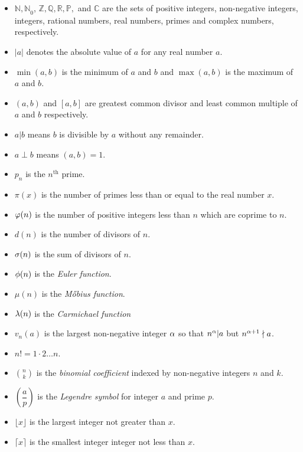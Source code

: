\documentclass{subfile}
\begin{document}
		\begin{itemize}
			\item $\mathbb{N,N}_0$, $\mathbb{Z, Q, R, P},$ and $\mathbb{C}$ are the sets of positive integers, non-negative integers, integers, rational numbers, real numbers, primes and complex numbers, respectively.
			\item $|a|$ denotes the absolute value of $a$ for any real number $a$.
			\item $\min(a,b)$ is the minimum of $a$ and $b$ and $\max(a,b)$ is the maximum of $a$ and $b$.
			\item $(a,b)$ and $[a,b]$ are greatest common divisor and least common multiple of $a$ and $b$ respectively.
			\item $a|b$ means $b$ is divisible by $a$ without any remainder.
			\item $a\perp b$ means $(a,b)=1$.
			\item $p_n$ is the $n^{\text{th}}$ prime.
			\item $\pi(x)$ is the number of primes less than or equal to the real number $x$.		
			\item $\varphi(n)$ is the number of positive integers less than $n$ which are coprime to $n$.
			\item $d(n)$ is the number of divisors of $n$.
			\item $\sigma(n)$ is the sum of divisors of $n$.
			\item $\phi(n)$ is the {\it Euler function}.
			\item $\mu(n)$ is the {\it M\H{o}bius function}.
			\item $\lambda(n)$ is the {\it Carmichael function}
			\item $v_n(a)$ is the largest non-negative integer $\alpha$ so that $n^\alpha|a$ but $n^{\alpha+1}\nmid a$.
			\item $n!=1\cdot2\dots n$.
			\item $\displaystyle \binom{n}{k}$ is the \textit{binomial coefficient} indexed by non-negative integers $n$ and $k$.
			\item $\left(\dfrac{a}{p}\right)$ is the \textit{Legendre symbol} for integer $a$ and prime $p$.
			\item $\lfloor x \rfloor$ is the  largest integer not greater than $x$.
			\item $\lceil x \rceil$ is the smallest integer integer not less than $x$.
		\end{itemize}
	
		\newpage
\end{document}
